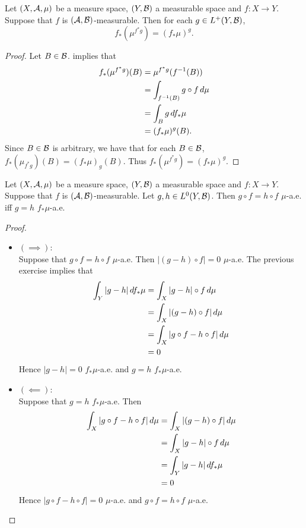 \documentclass{book}
\begin{document}
	\begin{ex} 
		Let $(X, \mathcal{A}, \mu)$ be a measure space, $(Y, \mathcal{B})$ a measurable space and $f: X \rightarrow Y$. Suppose that $f$ is $(\mathcal{A}, \mathcal{B})$-measurable. Then for each $g \in L^+(Y, \mathcal{B})$, 
		$$f_*(\mu^{f^*g}) = (f_*\mu)^g.$$
	\end{ex}

	\begin{proof}
		Let $B \in \mathcal{B}$.  implies that
		\begin{align*}
			f_*(\mu^{f^*g})(B)
			& = \mu^{f^*g}(f^{-1}(B)) \\
			& = \int_{f^{-1}(B)} g \circ f \, d \mu \\
			& = \int_B g \, d f_*\mu \\
			& = (f_*\mu)^g(B).
		\end{align*}
		Since $B \in \mathcal{B}$ is arbitrary, we have that for each $B \in \mathcal{B}$, $f_*(\mu_{f^*g})(B) = (f_*\mu)_g(B)$. Thus $f_*(\mu^{f^*g}) = (f_*\mu)^g$. 
	\end{proof}

	\begin{ex} 
		Let $(X, \mathcal{A}, \mu)$ be a measure space, $(Y, \mathcal{B})$ a measurable space and $f: X \rightarrow Y$. Suppose that $f$ is $(\mathcal{A}, \mathcal{B})$-measurable. Let $g, h \in L^0(Y, \mathcal{B})$. Then $g \circ f = h \circ f$ $\mu$-a.e. iff $g = h$ $f_*\mu$-a.e.
	\end{ex}

	\begin{proof} \
		\begin{itemize}
			\item $(\implies)$: \\
			Suppose that $g \circ f = h \circ f$ $\mu$-a.e. Then $|(g - h) \circ f| = 0$ $\mu$-a.e. The previous exercise implies that 
			\begin{align*}
				\int_Y |g - h|  \, d f_*\mu 
				& = \int_X |g - h| \circ f \, d \mu \\
				& = \int_X |(g - h) \circ f| \, d \mu \\
				& = \int_X |g  \circ f - h  \circ f| \, d \mu \\
				& = 0
			\end{align*}
			Hence $|g - h| = 0$ $f_*\mu$-a.e. and $g = h$ $f_*\mu$-a.e.
			\item $(\impliedby)$: \\
			Suppose that $g = h$ $f_*\mu$-a.e. Then 
			\begin{align*}
				\int_X |g  \circ f - h  \circ f| \, d \mu 
				& = \int_X |(g - h) \circ f| \, d \mu \\
				& = \int_X |g - h| \circ f \, d \mu \\
				& = \int_Y |g - h|  \, d f_*\mu \\
				& = 0
			\end{align*}
			Hence $|g  \circ f - h  \circ f| = 0$  $\mu$-a.e. and $g  \circ f = h  \circ f$ $\mu$-a.e. 
		\end{itemize}
	\end{proof}
\end{document}
